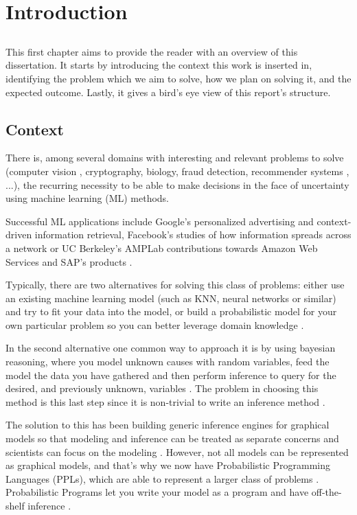 \chapter{Introduction} \label{chap:intro}

\section*{}

This first chapter aims to provide the reader with an overview of this
dissertation. It starts by introducing the context this work is inserted in,
identifying the problem which we aim to solve, how we plan on solving it, and
the expected outcome. Lastly, it gives a bird's eye view of this report's
structure.

\section{Context} \label{sec:context}

There is, among several domains with interesting and relevant problems to solve
(computer vision \cite{Kulkarni2015}, cryptography, biology, fraud detection,
recommender systems \cite{intml}, ...), the recurring necessity to be able to
make decisions in the face of uncertainty using machine learning (ML) methods.

Successful ML applications include Google's personalized advertising and
context-driven information retrieval, Facebook's studies of how information
spreads across a network or UC Berkeley's AMPLab contributions towards Amazon
Web Services and SAP's products \cite{Broder:2015:BDN:2684822.2697027}.

Typically, there are two alternatives for solving this class of problems: either use an
existing machine learning model (such as KNN, neural networks or similar) \cite{mlnot} and
try to fit your data into the model, or build a probabilistic model for your
own particular problem so you can better leverage domain knowledge \cite{SciPy}.

In the second alternative one common way to approach it is by using bayesian reasoning,
where you model unknown causes with random variables, feed the model the data you
have gathered and then perform inference to query for the
desired, and previously unknown, variables \cite{thbay}. The problem in choosing
this method is this last step since it is non-trivial
to write an inference method \cite{Duvenaud}.

The solution to this has been building generic inference engines for graphical
models so that modeling and inference can be treated as separate concerns and
scientists can focus on the modeling \cite{Jordan1996}. However, not all models can be represented as
graphical models, and that’s why we now have Probabilistic Programming Languages
(PPLs), which are able to represent a larger class of problems \cite{intpp}.
Probabilistic Programs let you write your model as a program and have
off-the-shelf inference \cite{Prekopa2003}.

